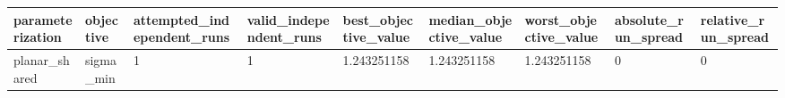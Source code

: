 \begin{tabular}{@{}lllllllll@{}}
\toprule
parameterization & objective & attempted\_independent\_runs & valid\_independent\_runs & best\_objective\_value & median\_objective\_value & worst\_objective\_value & absolute\_run\_spread & relative\_run\_spread \\
\midrule
planar\_shared & sigma\_min & 1 & 1 & 1.243251158 & 1.243251158 & 1.243251158 & 0 & 0 \\
\bottomrule
\end{tabular}
